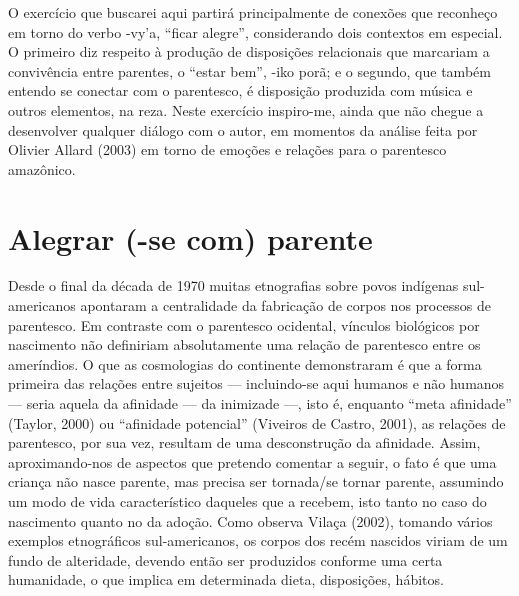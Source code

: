 O exercício que buscarei aqui partirá principalmente de conexões que
reconheço em torno do verbo -vy’a, ``ficar alegre'', considerando dois
contextos em especial. O primeiro diz respeito à produção de
disposições relacionais que marcariam a convivência entre parentes, o
``estar bem'', -iko porã; e o segundo, que também entendo se conectar com
o parentesco, é disposição produzida com música e outros elementos, na
reza. Neste exercício inspiro-me, ainda que não chegue a desenvolver
qualquer diálogo com o autor, em momentos da análise feita por Olivier
Allard (2003) em torno de emoções e relações para o parentesco
amazônico.

\section{Alegrar (-se com) parente}

Desde o final da década de 1970 muitas etnografias sobre povos indígenas
sul-americanos apontaram a centralidade da fabricação de corpos nos
processos de parentesco. Em contraste com o parentesco ocidental,
vínculos biológicos por nascimento não definiriam absolutamente uma
relação de parentesco entre os ameríndios. O que as cosmologias do
continente demonstraram é que a forma primeira das relações entre
sujeitos — incluindo-se aqui humanos e não humanos — seria aquela da
afinidade — da inimizade —, isto é, enquanto ``meta afinidade'' (Taylor,
2000) ou ``afinidade potencial'' (Viveiros de Castro, 2001), as relações
de parentesco, por sua vez, resultam de uma desconstrução da afinidade.
Assim, aproximando-nos de aspectos que pretendo comentar a seguir, o
fato é que uma criança não nasce parente, mas precisa ser tornada/se
tornar parente, assumindo um modo de vida característico daqueles que a
recebem, isto tanto no caso do nascimento quanto no da adoção. Como
observa Vilaça (2002), tomando vários exemplos etnográficos
sul-americanos, os corpos dos recém nascidos viriam de um fundo de
alteridade, devendo então ser produzidos conforme uma certa humanidade,
o que implica em determinada dieta, disposições, hábitos.

